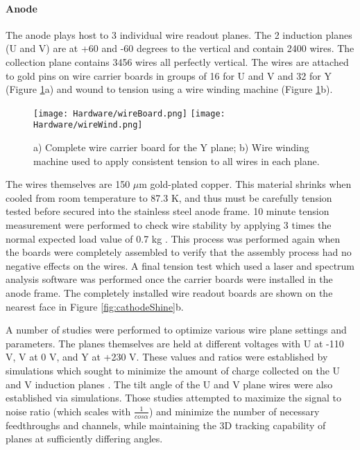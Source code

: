 \paragraph{Anode}
\par The anode plays host to 3 individual wire readout planes. The 2 induction planes (U and V) are at +60 and -60 degrees to the vertical and contain 2400 wires. The collection plane contains 3456 wires all perfectly vertical. The wires are attached to gold pins on wire carrier boards in groups of 16 for U and V and 32 for Y (Figure \ref{fig:wire_stuff}a) and wound to tension using a wire winding machine (Figure \ref{fig:wire_stuff}b). 

\begin{figure}[h!]
\centering
\texttt{[image: Hardware/wireBoard.png]}
\hspace{3 mm} 
\texttt{[image: Hardware/wireWind.png]}
\caption{ a) Complete wire carrier board for the Y plane; b) Wire winding machine used to apply consistent tension to all wires in each plane. }
\label{fig:wire_stuff}
\end{figure}

\par The wires themselves are 150 $\mu$m gold-plated copper.  This material shrinks when cooled from room temperature to 87.3 K, and thus must be carefully tension tested before secured into the stainless steel anode frame. 10 minute tension measurement were performed to check wire stability by applying 3 times the normal expected load value of 0.7 kg \cite{bib:uboone_JINST}.  This process was performed again when the boards were completely assembled to verify that the assembly process had no negative effects on the wires. A final tension test which used a laser and spectrum analysis software was performed once the carrier boards were installed in the anode frame. The completely installed wire readout boards are shown on the nearest face in Figure \ref{fig:cathodeShine}b.

\par A number of studies were performed to optimize various wire plane settings and parameters. The planes themselves are held at different voltages with U at -110 V, V at 0 V, and Y at +230 V.  These values and ratios were established by simulations which sought to minimize the amount of charge collected on the U and V induction planes \cite{bib:tdr} \cite{bib:uboone_proposal}.  The tilt angle of the U and V plane wires were also established via simulations.  Those studies attempted to maximize the signal to noise ratio (which scales with $\frac{1}{cos\alpha}$) and minimize the number of necessary feedthroughs and channels, while maintaining the 3D tracking capability of planes at sufficiently differing angles.

